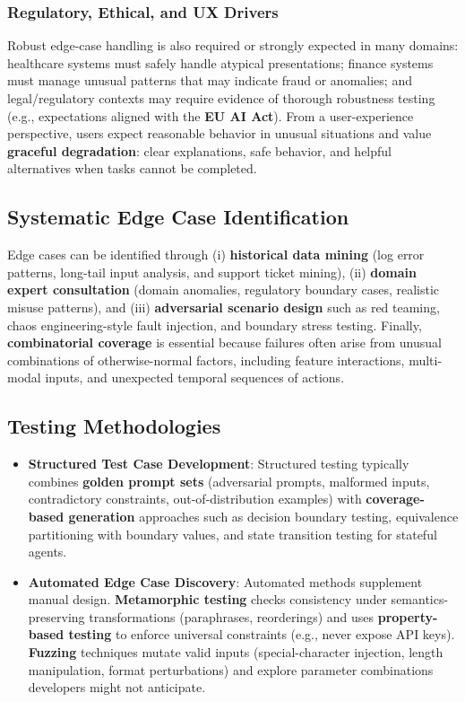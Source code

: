 \begin{TNtwocol}
\subsubsection*{Regulatory, Ethical, and UX Drivers}
Robust edge-case handling is also required or strongly expected in many domains: healthcare systems must safely handle atypical presentations; finance systems must manage unusual patterns that may indicate fraud or anomalies; and legal/regulatory contexts may require evidence of thorough robustness testing (e.g., expectations aligned with the \textbf{EU AI Act}). From a user-experience perspective, users expect reasonable behavior in unusual situations and value \textbf{graceful degradation}: clear explanations, safe behavior, and helpful alternatives when tasks cannot be completed.

\subsection*{Systematic Edge Case Identification}
Edge cases can be identified through (i) \textbf{historical data mining} (log error patterns, long-tail input analysis, and support ticket mining), (ii) \textbf{domain expert consultation} (domain anomalies, regulatory boundary cases, realistic misuse patterns), and (iii) \textbf{adversarial scenario design} such as red teaming, chaos engineering-style fault injection, and boundary stress testing. Finally, \textbf{combinatorial coverage} is essential because failures often arise from unusual combinations of otherwise-normal factors, including feature interactions, multi-modal inputs, and unexpected temporal sequences of actions.

\subsection*{Testing Methodologies}

\begin{itemize}
\item\textbf{{Structured Test Case Development}}: Structured testing typically combines \textbf{golden prompt sets} (adversarial prompts, malformed inputs, contradictory constraints, out-of-distribution examples) with \textbf{coverage-based generation} approaches such as decision boundary testing, equivalence partitioning with boundary values, and state transition testing for stateful agents.

\item\textbf{{Automated Edge Case Discovery}}: Automated methods supplement manual design. \textbf{Metamorphic testing} checks consistency under semantics-preserving transformations (paraphrases, reorderings) and uses \textbf{property-based testing} to enforce universal constraints (e.g., never expose API keys). \textbf{Fuzzing} techniques mutate valid inputs (special-character injection, length manipulation, format perturbations) and explore parameter combinations developers might not anticipate.


\end{itemize}
\end{TNtwocol}
